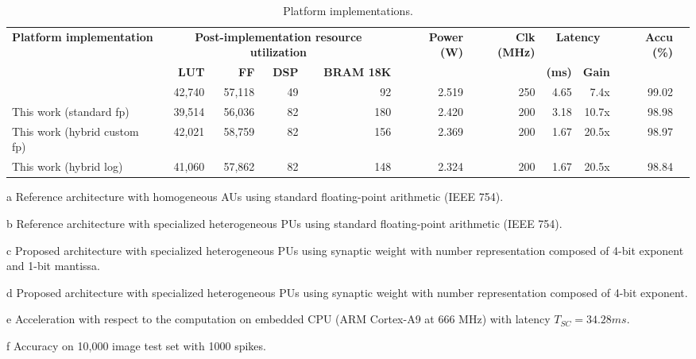 \begin{table}[!t]
	\begin{threeparttable}
		\centering
		\caption{Platform implementations.}\label{tab:platform_comparison}
		\scriptsize
		\begin{tabular}{lrrrrrrrrrr}\toprule
			\multirow{2}{*}{\textbf{Platform implementation}} &\multicolumn{4}{c}{\textbf{Post-implementation resource utilization}} &\multirow{2}{*}{\textbf{Power (W)}} &\multirow{2}{*}{\textbf{Clk (MHz)}} &\multicolumn{2}{c}{\textbf{Latency}} &\multirow{2}{*}{\textbf{Accu (\%)\tnote{f}}} \\\cmidrule{2-5}\cmidrule{8-9}
			&\textbf{LUT} &\textbf{FF} &\textbf{DSP} &\textbf{BRAM 18K} & & &\textbf{(ms)} &\textbf{Gain\tnote{e}} & \\\midrule
			\cite{nevarez2020accelerator}\tnote{a} &42,740 &57,118 &49 &92 &2.519 &250 &4.65 &7.4x &99.02 \\
			This work (standard \gls{fp})\tnote{b} &39,514 &56,036 &82 &180 &2.420 &200 &3.18 &10.7x &98.98 \\
			This work (hybrid custom \gls{fp})\tnote{c} &42,021 &58,759 &82 &156 &2.369 &200 &1.67 &20.5x &98.97 \\
			This work (hybrid log)\tnote{d} &41,060 &57,862 &82 &148 &2.324 &200 &1.67 &20.5x &98.84 \\
			\bottomrule
		\end{tabular}
		\begin{tablenotes}
			\scriptsize
			\item[a] Reference architecture with homogeneous AUs using standard floating-point arithmetic (IEEE 754).
			\item[b] Reference architecture with specialized heterogeneous PUs using standard floating-point arithmetic (IEEE 754).
			\item[c] Proposed architecture with specialized heterogeneous PUs using synaptic weight with number representation composed of 4-bit exponent and 1-bit mantissa.
			\item[d] Proposed architecture with specialized heterogeneous PUs using synaptic weight with number representation composed of 4-bit exponent.
			\item[e] Acceleration with respect to the computation on embedded CPU (ARM Cortex-A9 at 666 MHz) with latency $T_{SC} = 34.28 ms$.
			\item[f] Accuracy on 10,000 image test set with 1000 spikes.
		\end{tablenotes}
	\end{threeparttable}
\end{table}

